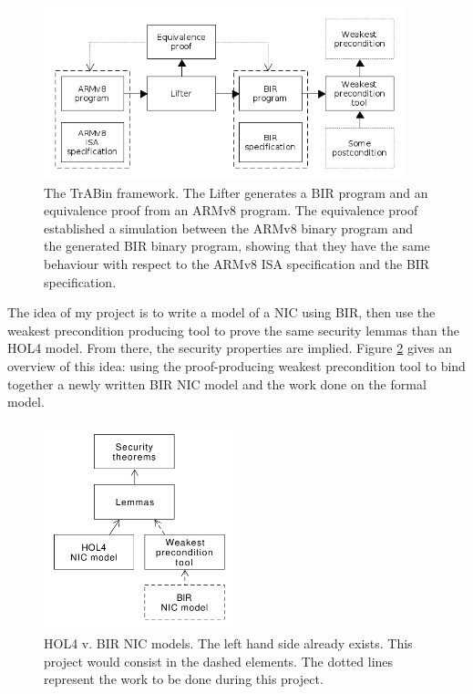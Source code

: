 \documentclass{kththesis}
\begin{document}
\begin{figure}[!ht]
	\includegraphics[height=5cm]{figures/trabin-overview.png}
	\centering
	\caption{The TrABin framework. The Lifter generates a BIR program and an
		equivalence proof from an ARMv8 program. The equivalence proof
		established a simulation between the ARMv8 binary program and the
		generated BIR binary program, showing that they have the same behaviour
	with respect to the ARMv8 ISA specification and the BIR specification.}
	\label{trabin-overview}
\end{figure}

The idea of my project is to write a model of a NIC using BIR, then use the
weakest precondition producing tool to prove the same security lemmas than the
HOL4 model. From there, the security properties are implied. Figure
\ref{hol-v-bir-nic-model-simple} gives an overview of this idea: using the
proof-producing weakest precondition tool to bind together a newly written BIR
NIC model and the work done on the formal model.

\begin{figure}[!ht]
	\includegraphics[height=6cm]{figures/figure-2.png}
	\centering
	\caption{HOL4 v. BIR NIC models. The left hand side already exists. This
		project would consist in the dashed elements. The dotted lines represent
	the work to be done during this project.}
	\label{hol-v-bir-nic-model-simple}
\end{figure}
\end{document}
